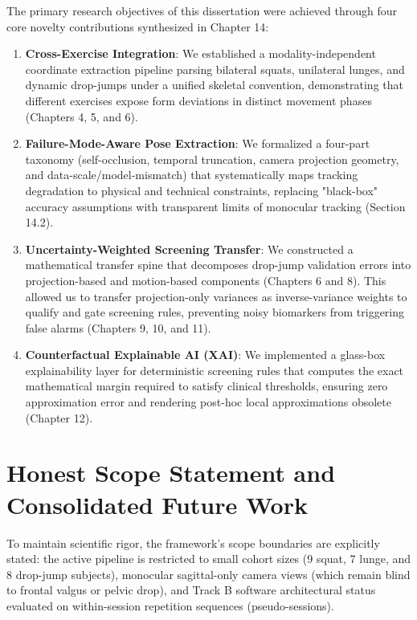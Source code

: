 The primary research objectives of this dissertation were achieved through four core novelty contributions synthesized in Chapter 14:
\begin{enumerate}
  \item \textbf{Cross-Exercise Integration}: We established a modality-independent coordinate extraction pipeline parsing bilateral squats, unilateral lunges, and dynamic drop-jumps under a unified skeletal convention, demonstrating that different exercises expose form deviations in distinct movement phases (Chapters 4, 5, and 6).
  \item \textbf{Failure-Mode-Aware Pose Extraction}: We formalized a four-part taxonomy (self-occlusion, temporal truncation, camera projection geometry, and data-scale/model-mismatch) that systematically maps tracking degradation to physical and technical constraints, replacing "black-box" accuracy assumptions with transparent limits of monocular tracking (Section 14.2).
  \item \textbf{Uncertainty-Weighted Screening Transfer}: We constructed a mathematical transfer spine that decomposes drop-jump validation errors into projection-based and motion-based components (Chapters 6 and 8). This allowed us to transfer projection-only variances as inverse-variance weights to qualify and gate screening rules, preventing noisy biomarkers from triggering false alarms (Chapters 9, 10, and 11).
  \item \textbf{Counterfactual Explainable AI (XAI)}: We implemented a glass-box explainability layer for deterministic screening rules that computes the exact mathematical margin required to satisfy clinical thresholds, ensuring zero approximation error and rendering post-hoc local approximations obsolete (Chapter 12).
\end{enumerate}



\section{Honest Scope Statement and Consolidated Future Work}
\label{sec:15-3-honest-scope-statement-and-consolidated-future-work}

To maintain scientific rigor, the framework's scope boundaries are explicitly stated: the active pipeline is restricted to small cohort sizes (9 squat, 7 lunge, and 8 drop-jump subjects), monocular sagittal-only camera views (which remain blind to frontal valgus or pelvic drop), and Track B software architectural status evaluated on within-session repetition sequences (pseudo-sessions).

